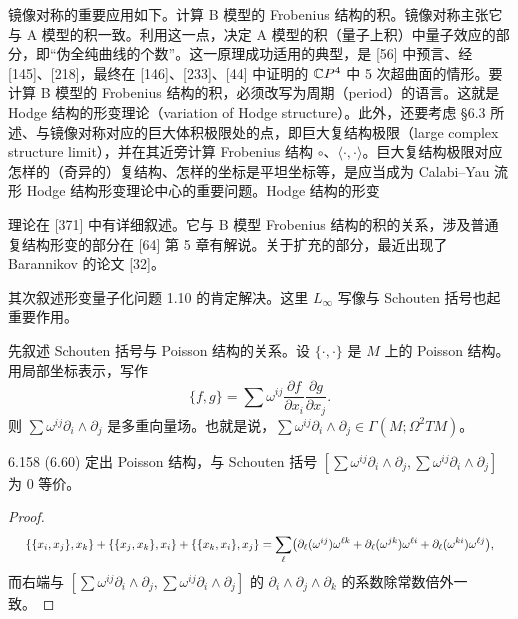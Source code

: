 镜像对称的重要应用如下。计算 B 模型的 Frobenius 结构的积。镜像对称主张它与 A 模型的积一致。利用这一点，决定 A 模型的积（量子上积）中量子效应的部分，即“伪全纯曲线的个数”。这一原理成功适用的典型，是 [56] 中预言、经 [145]、[218]，最终在 [146]、[233]、[44] 中证明的 $\mathbb{C}P^4$ 中 5 次超曲面的情形。要计算 B 模型的 Frobenius 结构的积，必须改写为周期（period）的语言。这就是 Hodge 结构的形变理论（variation of Hodge structure）。此外，还要考虑 §6.3 所述、与镜像对称对应的巨大体积极限处的点，即巨大复结构极限（large complex structure limit），并在其近旁计算 Frobenius 结构 $\circ$、$\langle\cdot,\cdot\rangle$。巨大复结构极限对应怎样的（奇异的）复结构、怎样的坐标是平坦坐标等，是应当成为 Calabi–Yau 流形 Hodge 结构形变理论中心的重要问题。Hodge 结构的形变

理论在 [371] 中有详细叙述。它与 B 模型 Frobenius 结构的积的关系，涉及普通复结构形变的部分在 [64] 第 5 章有解说。关于扩充的部分，最近出现了 Barannikov 的论文 [32]。

其次叙述形变量子化问题 1.10 的肯定解决。这里 $L_{\infty}$ 写像与 Schouten 括号也起重要作用。

先叙述 Schouten 括号与 Poisson 结构的关系。设 $\{\cdot,\cdot\}$ 是 $M$ 上的 Poisson 结构。用局部坐标表示，写作
\begin{equation}
  \{f,g\}=\sum\omega^{ij}\frac{\partial f}{\partial x_i}\frac{\partial g}{\partial x_j}. \tag{6.60}
\end{equation}
则 $\sum\omega^{ij}\partial_i\wedge\partial_j$ 是多重向量场。也就是说，$\sum\omega^{ij}\partial_i\wedge\partial_j\in\Gamma(M;\Omega^2TM)$。

\begin{lemma*}{6.158}
  (6.60) 定出 Poisson 结构，与 Schouten 括号 $[\sum\omega^{ij}\partial_i\wedge\partial_j,\sum\omega^{ij}\partial_i\wedge\partial_j]$ 为 0 等价。
\end{lemma*}

\begin{proof}
\[
  \resizebox{0.97\linewidth}{!}{$\displaystyle \{\{x_i,x_j\},x_k\}+\{\{x_j,x_k\},x_i\}+\{\{x_k,x_i\},x_j\} =\sum_\ell\bigl(\partial_\ell(\omega^{ij})\omega^{\ell k} +\partial_\ell(\omega^{jk})\omega^{\ell i}+\partial_\ell(\omega^{ki})\omega^{\ell j}\bigr), $}
\]
  而右端与 $[\sum\omega^{ij}\partial_i\wedge\partial_j,\sum\omega^{ij}\partial_i\wedge\partial_j]$ 的 $\partial_i\wedge\partial_j\wedge\partial_k$ 的系数除常数倍外一致。
\end{proof}


